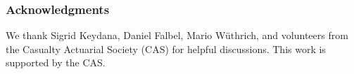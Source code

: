 \documentclass{article}
\begin{document}
\subsubsection*{Acknowledgments}

We thank Sigrid Keydana, Daniel Falbel, Mario Wüthrich, and volunteers from the Casualty Actuarial Society (CAS) for helpful discussions. This work is supported by the CAS.









% 
% 
% 
\end{document}
